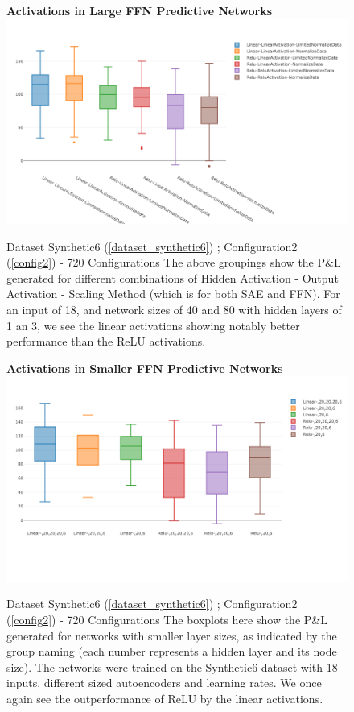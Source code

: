 \documentclass[a4paper,11pt,oneside]{article}
\theoremstyle{plain}
\theoremstyle{definition}
\begin{document}
\begin{figure}[H]
	\centering 
	\textbf{Activations in Large FFN Predictive Networks}
	\includegraphics[scale=0.4]{images/iteration_two/linear-ffn/Scaling_Methodolgy_Profits.png}
		\caption{Dataset Synthetic6  (\ref{dataset_synthetic6}) ; Configuration2 (\ref{config2}) - 720 Configurations
			\newline \newline The above groupings show the P\&L generated for different combinations of Hidden Activation - Output Activation - Scaling Method (which is for both SAE and FFN). For an input of 18, and network sizes of 40 and 80 with hidden layers of 1 an 3, we see the linear activations showing notably better performance than the ReLU activations.
		}	
		\label{figure-results-linear-ffn_activations}
\end{figure}

\begin{figure}[H]
	\centering 
	\textbf{Activations in Smaller FFN Predictive Networks}
	\includegraphics[scale=0.4]{images/iteration_three/it3_linear_vs_relu.png}
	\caption{Dataset Synthetic6  (\ref{dataset_synthetic6}) ; Configuration2 (\ref{config2}) - 720 Configurations
		\newline \newline The boxplots here show the P\&L generated for networks with smaller layer sizes, as indicated by the group naming (each number represents a hidden layer and its node size). The networks were trained on the Synthetic6 dataset with 18 inputs, different sized autoencoders and learning rates. We once again see the outperformance of ReLU by the linear activations.}
	\label{figure-results_linear_vs_relu}
\end{figure}
\end{document}
